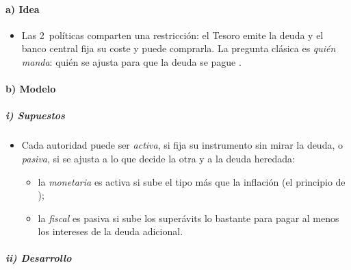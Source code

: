 \documentclass[11pt]{article}
\begin{document}
\paragraph{a) Idea}

\begin{itemize}
\item Las 2~políticas comparten una restricción: el Tesoro emite la deuda y el banco central fija su coste y puede comprarla. La pregunta clásica es \emph{quién manda}: quién se ajusta para que la deuda se pague\nocite{SargentWallace1981Some,Leeper1991} .
\end{itemize}

\paragraph{b) Modelo}

\subparagraph{i) Supuestos}

\begin{itemize}
\item Cada autoridad puede ser \emph{activa}, si fija su instrumento sin mirar la deuda, o \emph{pasiva}, si se ajusta a lo que decide la otra y a la deuda heredada\nocite{Leeper1991}:
  \begin{itemize}
  \item la \emph{monetaria} es activa si sube el tipo más que la inflación (el principio de );
  \item la \emph{fiscal} es pasiva si sube los superávits lo bastante para pagar al menos los intereses de la deuda adicional.
  \end{itemize}
\end{itemize}

\subparagraph{ii) Desarrollo}
\end{document}
